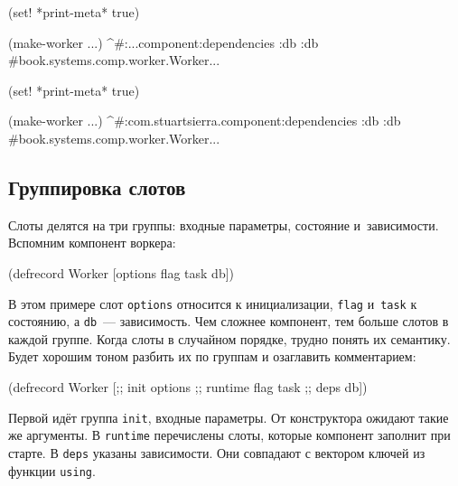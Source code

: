 \ifx\DEVICETYPE\MOBILE

\begin{english}
  \begin{clojure}
(set! *print-meta* true)

(make-worker {...})
^#:...component{:dependencies {:db :db}}
#book.systems.comp.worker.Worker{...}
  \end{clojure}
\end{english}

\else

\begin{english}
  \begin{clojure}
(set! *print-meta* true)

(make-worker {...})
^#:com.stuartsierra.component{:dependencies {:db :db}}
#book.systems.comp.worker.Worker{...}
  \end{clojure}
\end{english}

\fi

\subsection{Группировка слотов}


Слоты делятся на три группы: входные параметры, состояние
и~зависимости. Вспомним компонент воркера:

\begin{english}
  \begin{clojure}
(defrecord Worker
    [options flag task db])
  \end{clojure}
\end{english}

В этом примере слот \verb|options| относится к инициализации, \verb|flag|
и~\verb|task| к состоянию, а \verb|db|~--- зависимость. Чем сложнее компонент,
тем больше слотов в каждой группе. Когда слоты в случайном порядке, трудно
понять их семантику. Будет хорошим тоном разбить их по группам и озаглавить
комментарием:

\begin{english}
  \begin{clojure}
(defrecord Worker
    [;; init
     options
     ;; runtime
     flag
     task
     ;; deps
     db])
  \end{clojure}
\end{english}

Первой идёт группа \verb|init|, входные параметры. От конструктора ожидают
такие же аргументы. В \verb|runtime| перечислены слоты, которые компонент
заполнит при старте. В \verb|deps| указаны зависимости. Они совпадают с
вектором ключей из функции \verb|using|.

